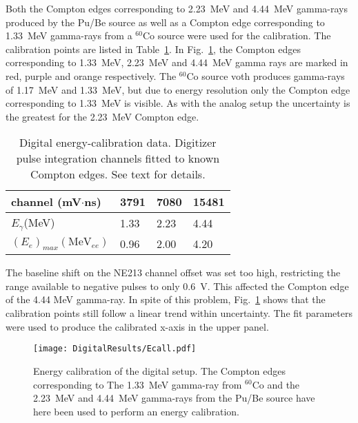 \documentclass[main.tex]{subfiles}
\begin{document}
Both the Compton edges corresponding to \SI{2.23}{\MeV} and \SI{4.44}{\MeV} gamma-rays produced by the Pu/Be source as well as a Compton edge corresponding to \SI{1.33}{MeV} gamma-rays from a $^{60}$Co source were used for the calibration. The calibration points are listed in Table~\ref{tab:knox_d}. In Fig.~\ref{fig:D_QDC}, the Compton edges corresponding to \SI{1.33}{\MeV}, \SI{2.23}{\MeV} and \SI{4.44}{\MeV} gamma rays are marked in red, purple and orange respectively. The $^{60}$Co source voth produces gamma-rays of \SI{1.17}{\MeV} and \SI{1.33}{\MeV}, but due to energy resolution only the Compton edge corresponding to \SI{1.33}{MeV} is visible.  As with the analog setup the uncertainty is the greatest for the \SI{2.23}{\MeV} Compton edge.

\begin{table}[hb]
	\center
	\begin{tabular}{|l|l|l|l|}
	\hline
	channel (mV$\cdot$ns)            & 3791 & 7080  & 15481  \\
	\hline
	$E_\gamma$(MeV)          & 1.33    & 2.23  & 4.44 \\
	\hline
	$(E_{e})_{max} (\textrm{MeV}_{ee})$ & 0.96    & 2.00  & 4.20 \\
	\hline
	\end{tabular}
   	\captionsetup{width=0.435\linewidth}
	\caption[Digital energy-calibration data.]{Digital energy-calibration data. Digitizer pulse integration channels fitted to known Compton edges. See text for details.}
	\label{tab:knox_d}
\end{table}

The baseline shift on the NE213 channel offset was set too high, restricting the range available to negative pulses to only \SI{0.6}{V}. This affected the Compton edge of the 4.44 \si{\MeV} gamma-ray. In spite of this problem, Fig.~\ref{fig:D_QDC} shows that the calibration points still follow a linear trend within uncertainty. The fit parameters were used to produce the calibrated x-axis in the upper panel.

\begin{figure}[ht]
    \centering
        \texttt{[image: DigitalResults/Ecall.pdf]}
        \caption[Energy calibration of the digital setup]{Energy calibration of the digital setup. The Compton edges corresponding to The \SI{1.33}{\MeV} gamma-ray from $^{60}$Co and the \SI{2.23}{\MeV} and \SI{4.44}{\MeV} gamma-rays from the Pu/Be source have here been used to perform an energy calibration.}
    \label{fig:D_QDC}
\end{figure}
\end{document}
